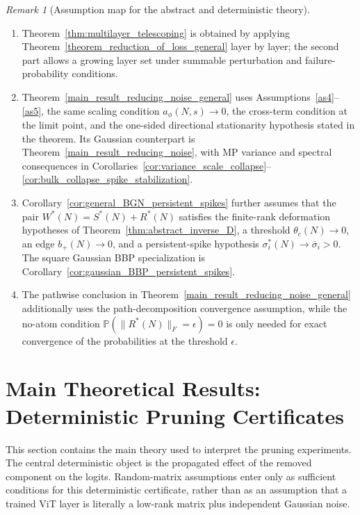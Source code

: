 \documentclass[11pt]{article}
\theoremstyle{plain}
\theoremstyle{definition}
\theoremstyle{remark}
\newtheorem{rem}[thm]{Remark}
\newcommand{\PP}{\mathbb{P}}
\newcommand{\1}{\mathbf{1}}
\begin{document}
\begin{rem}[Assumption map for the abstract and deterministic theory]
\begin{enumerate}[leftmargin=2em]
\item Theorem~\ref{thm:multilayer_telescoping} is obtained by applying Theorem~\ref{theorem_reduction_of_loss_general} layer by layer; the second part allows a growing layer set under summable perturbation and failure-probability conditions.
\item Theorem~\ref{main_result_reducing_noise_general} uses Assumptions~\ref{as4}--\ref{as5}, the same scaling condition \(a_\phi(N,s)\to0\), the cross-term condition at the limit point, and the one-sided directional stationarity hypothesis stated in the theorem. Its Gaussian counterpart is Theorem~\ref{main_result_reducing_noise}, with MP variance and spectral consequences in Corollaries~\ref{cor:variance_scale_collapse}--\ref{cor:bulk_collapse_spike_stabilization}.
\item Corollary~\ref{cor:general_BGN_persistent_spikes} further assumes that the pair \(W^*(N)=S^*(N)+R^*(N)\) satisfies the finite-rank deformation hypotheses of Theorem~\ref{thm:abstract_inverse_D}, a threshold \(\theta_c(N)\to0\), an edge \(b_+(N)\to0\), and a persistent-spike hypothesis \(\sigma_i^*(N)\to\bar\sigma_i>0\). The square Gaussian BBP specialization is Corollary~\ref{cor:gaussian_BBP_persistent_spikes}.
\item The pathwise conclusion in Theorem~\ref{main_result_reducing_noise_general} additionally uses the path-decomposition convergence assumption, while the no-atom condition \(\PP(\|R^*(N)\|_F=\epsilon)=0\) is only needed for exact convergence of the probabilities at the threshold \(\epsilon\).
\end{enumerate}
\end{rem}




\section{Main Theoretical Results: Deterministic Pruning Certificates}
\label{Main_theory_gen}

This section contains the main theory used to interpret the pruning experiments.  The central deterministic object is the propagated effect of the removed component on the logits.  Random-matrix assumptions enter only as sufficient conditions for this deterministic certificate, rather than as an assumption that a trained ViT layer is literally a low-rank matrix plus independent Gaussian noise.
\end{document}
